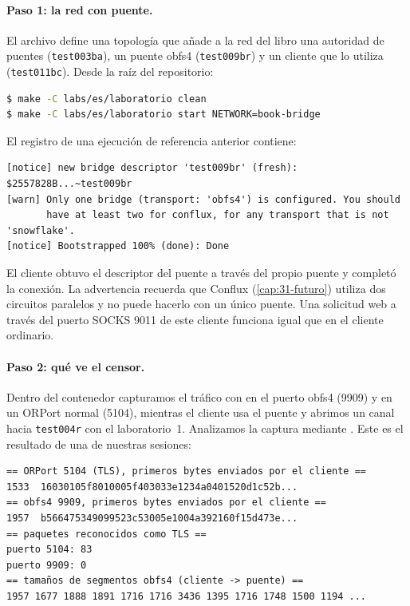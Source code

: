 \paragraph{Paso 1: la red con puente.} El archivo  define una topología que añade a la red del libro una autoridad de puentes (\texttt{test003ba}), un puente obfs4 (\texttt{test009br}) y un cliente que lo utiliza (\texttt{test011bc}). Desde la raíz del repositorio:
\begin{lstlisting}[language=bash,numbers=none]
$ make -C labs/es/laboratorio clean
$ make -C labs/es/laboratorio start NETWORK=book-bridge
\end{lstlisting}

El registro de una ejecución de referencia anterior contiene:
\begin{lstlisting}[numbers=none]
[notice] new bridge descriptor 'test009br' (fresh): $2557828B...~test009br
[warn] Only one bridge (transport: 'obfs4') is configured. You should
       have at least two for conflux, for any transport that is not 'snowflake'.
[notice] Bootstrapped 100% (done): Done
\end{lstlisting}

El cliente obtuvo el descriptor del puente a través del propio puente y completó la conexión. La advertencia recuerda que Conflux (\cref{cap:31-futuro}) utiliza dos circuitos paralelos y no puede hacerlo con un único puente. Una solicitud web a través del puerto SOCKS 9011 de este cliente funciona igual que en el cliente ordinario.

\paragraph{Paso 2: qué ve el censor.} Dentro del contenedor capturamos el tráfico con  en el puerto obfs4 (9909) y en un ORPort normal (5104), mientras el cliente usa el puente y abrimos un canal hacia \texttt{test004r} con el laboratorio~1. Analizamos la captura mediante . Este es el resultado de una de nuestras sesiones:
\begin{lstlisting}[numbers=none]
== ORPort 5104 (TLS), primeros bytes enviados por el cliente ==
1533  16030105f8010005f403033e1234a0401520d1c52b...
== obfs4 9909, primeros bytes enviados por el cliente ==
1957  b566475349099523c53005e1004a392160f15d473e...
== paquetes reconocidos como TLS ==
puerto 5104: 83
puerto 9909: 0
== tamaños de segmentos obfs4 (cliente -> puente) ==
1957 1677 1888 1891 1716 1716 3436 1395 1716 1748 1500 1194 ...
\end{lstlisting}

